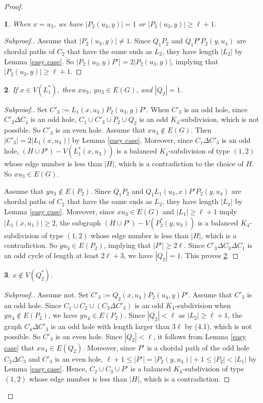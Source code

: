 \documentclass[11pt]{article}
\newtheorem{claim}{}[theorem]
\begin{document}
\begin{proof}
\begin{claim}\label{x=u3}
When $x=u_3$, we have $|P_2(u_3,y)|=1$ or $|P_2(u_3,y)|\geq\ell+1$.
\end{claim}
\begin{proof}[Subproof.]
Assume that $|P_2(u_3,y)|\neq1$. Since $Q_1P_2$ and $Q_1P'P_2(y,u_4)$ are chordal paths of $C_2$ that have the same ends as $L_2$, they have length $|L_2|$ by Lemma \ref{easy case}. So $|P_2(u_3,y)P'|=2|P_2(u_3,y)|$, implying that $|P_2(u_3,y)|\geq\ell+1$.
\end{proof}

\begin{claim}\label{location of x+}
If $x\in V(L_1^*)$, then $xu_3$, $yu_3\in E(G)$, and $|Q_2|=1$.
\end{claim}
\begin{proof}[Subproof.]
Set $C'_3:=L_1(x,u_3)P_2(u_3,y)P'$. When $C'_3$ is an odd hole, since $C'_3\Delta C_4$ is an odd hole, $C_1\cup C'_3\cup P_2\cup Q_2$ is an odd $K_4$-subdivision, which is not possible. So $C'_3$ is an even hole.
Assume that $xu_3\notin E(G)$. Then $|C'_3|=2|L_1(x,u_3)|$ by Lemma \ref{easy case}. Moreover, since $C_1\Delta C'_3$ is an odd hole, $(H\cup P')-V(L_1^*(x,u_3))$ is a balanced $K_4$-subdivision of type $(1,2)$ whose edge number is less than $|H|$, which is a contradiction to the choice of $H$. So $xu_3\in E(G)$.

Assume that $yu_3\notin E(P_2)$. Since $Q_1P_2$ and $Q_1 L_1(u_3,x)P'P_2(y,u_4)$ are chordal paths of $C_2$ that have the same ends as $L_2$, they have length $|L_2|$ by Lemma \ref{easy case}. Moreover, since $xu_3\in E(G)$ and $|L_1|\geq\ell+1$ imply $|L_1(x,u_1)|\geq2$, the subgraph $(H\cup P')-V(P_2^*(y,u_3))$ is a balanced $K_4$-subdivision of type $(1,2)$ whose edge number is less than $|H|$, which is a contradiction. So $yu_3\in E(P_2)$, implying that $|P'|\geq2\ell$. Since $C'_3\Delta C_3\Delta C_1$ is an odd cycle of length at least $2\ell+3$, we have $|Q_2|=1$. This proves \ref{location of x+}.
\end{proof}

\begin{claim}\label{x in Q2}
$x\notin V(Q^*_2)$.
\end{claim}
\begin{proof}[Subproof.]
Assume not. %
Set $C'_3:=Q_2(x,u_4)P_2(u_4,y)P'$. Assume that $C'_3$ is an odd hole. Since $C_1\cup C_2\cup (C_3\Delta C'_3)$ is an odd $K_4$-subdivision when $yu_4\notin E(P_2)$, we have $yu_4\in E(P_2)$. Since $|Q_2|<\ell$ as $|L_2|\geq\ell+1$, the graph $C_4\Delta C'_3$ is an odd hole with length larger than $3\ell$ by (4.1), which is not possible. So $C'_3$ is an even hole. Since $|Q_2|<\ell$, it follows from Lemma \ref{easy case} that $xu_4\in E(Q_2)$. Moreover, since $P'$ is a chordal path of the odd hole $C_2\Delta C_3$ and $C'_3$ is an even hole, $\ell+1\leq |P'|=|P_2(y,u_4)|+1\leq|P_2|<|L_1|$ by Lemma \ref{easy case}. Hence, $C_2\cup C_3\cup P'$ is a balanced $K_4$-subdivision of type $(1,2)$ whose edge number is less than $|H|$, which is a contradiction.
\end{proof}


\end{proof}
\end{document}
